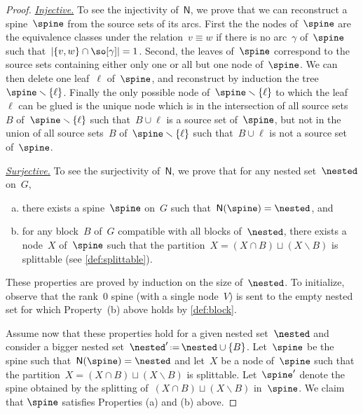 \documentclass{amsart}
\theoremstyle{definition}
\newcommand{\ssm}{\smallsetminus} %
\newcommand{\eqdef}{\mbox{\,\raisebox{0.2ex}{\scriptsize\ensuremath{\mathrm:}}\ensuremath{=}\,}} %
\newcommand{\para}[1]{\medskip\noindent\uline{\textit{#1.}}} %
\newcommand{\vertexSet}{V}
\newcommand{\spineToNested}{\mathsf{N}} %
\begin{document}
\begin{proof}
  \para{Injective}
  To see the injectivity of~$\spineToNested$, we prove that we can reconstruct a spine~$\spine$ from the source sets of its arcs.
  First the the nodes of~$\spine$ are the equivalence classes under the relation~$v \equiv w$ if there is no arc~$\gamma$ of~$\spine$ such that~$|\{v,w\} \cap \so[\gamma]| = 1$.
  Second, the leaves of~$\spine$ correspond to the source sets containing either only one or all but one node of~$\spine$. 
  We can then delete one leaf~$\ell$ of~$\spine$, and reconstruct by induction the tree~$\spine \ssm \{\ell\}$. 
  Finally the only possible node of~$\spine \ssm \{\ell\}$ to which the leaf~$\ell$ can be glued is the unique node which is in the intersection of all source sets~$B$ of~$\spine \ssm \{\ell\}$ such that~$B \cup \ell$ is a source set of~$\spine$, but not in the union of all source sets~$B$ of~$\spine \ssm \{\ell\}$ such that~$B \cup \ell$ is not a source set of~$\spine$.

  \para{Surjective}
  To see the surjectivity of~$\spineToNested$, we prove that for any nested set~$\nested$ on~$G$,
\begin{enumerate}[(a)]
\item there exists a spine~$\spine$ on~$G$ such that~$\spineToNested(\spine) = \nested$, and
\item for any block~$B$ of~$G$ compatible with all blocks of~$\nested$, there exists a node~$X$ of~$\spine$ such that the partition~$X = (X \cap B) \sqcup (X \ssm B)$ is splittable (see \cref{def:splittable}).
\end{enumerate}
  These properties are proved by induction on the size of~$\nested$.  
  To initialize, observe that the rank~$0$ spine (with a single node~$\vertexSet$) is sent to the empty nested set for which Property~(b) above holds by \cref{def:block}.

  Assume now that these properties hold for a given nested set~$\nested$ and consider a bigger nested set~$\nested' \eqdef \nested \cup \{B\}$.
  Let~$\spine$ be the spine such that~$\spineToNested(\spine) = \nested$ and let~$X$ be a node of~$\spine$ such that the partition~$X = (X \cap B) \sqcup (X \ssm B)$ is splittable.
  Let~$\spine'$ denote the spine obtained by the splitting of~$(X \cap B) \sqcup (X \ssm B)$ in~$\spine$.
  We claim that $\spine$ satisfies Properties (a) and (b) above.
  

\end{proof}
\end{document}
